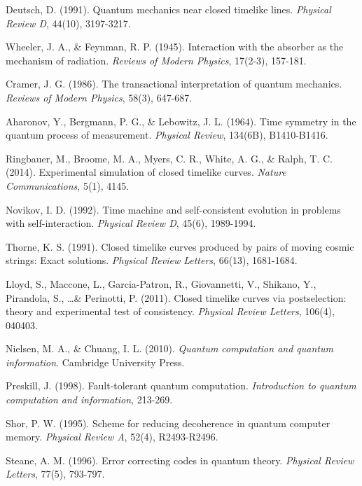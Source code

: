 \documentclass[12pt,a4paper]{article}
\begin{document}
\begin{thebibliography}{99}

Deutsch, D. (1991). Quantum mechanics near closed timelike lines. \textit{Physical Review D}, 44(10), 3197-3217.

Wheeler, J. A., \& Feynman, R. P. (1945). Interaction with the absorber as the mechanism of radiation. \textit{Reviews of Modern Physics}, 17(2-3), 157-181.

Cramer, J. G. (1986). The transactional interpretation of quantum mechanics. \textit{Reviews of Modern Physics}, 58(3), 647-687.

Aharonov, Y., Bergmann, P. G., \& Lebowitz, J. L. (1964). Time symmetry in the quantum process of measurement. \textit{Physical Review}, 134(6B), B1410-B1416.

Ringbauer, M., Broome, M. A., Myers, C. R., White, A. G., \& Ralph, T. C. (2014). Experimental simulation of closed timelike curves. \textit{Nature Communications}, 5(1), 4145.

Novikov, I. D. (1992). Time machine and self-consistent evolution in problems with self-interaction. \textit{Physical Review D}, 45(6), 1989-1994.

Thorne, K. S. (1991). Closed timelike curves produced by pairs of moving cosmic strings: Exact solutions. \textit{Physical Review Letters}, 66(13), 1681-1684.

Lloyd, S., Maccone, L., Garcia-Patron, R., Giovannetti, V., Shikano, Y., Pirandola, S., \ldots \& Perinotti, P. (2011). Closed timelike curves via postselection: theory and experimental test of consistency. \textit{Physical Review Letters}, 106(4), 040403.

Nielsen, M. A., \& Chuang, I. L. (2010). \textit{Quantum computation and quantum information}. Cambridge University Press.

Preskill, J. (1998). Fault-tolerant quantum computation. \textit{Introduction to quantum computation and information}, 213-269.

Shor, P. W. (1995). Scheme for reducing decoherence in quantum computer memory. \textit{Physical Review A}, 52(4), R2493-R2496.

Steane, A. M. (1996). Error correcting codes in quantum theory. \textit{Physical Review Letters}, 77(5), 793-797.


\end{thebibliography}
\end{document}
